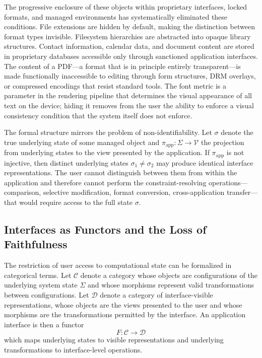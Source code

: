 \documentclass[12pt, oneside]{article}
\begin{document}
The progressive enclosure of these objects within proprietary interfaces, locked formats, and managed environments has systematically eliminated these conditions. File extensions are hidden by default, making the distinction between format types invisible. Filesystem hierarchies are abstracted into opaque library structures. Contact information, calendar data, and document content are stored in proprietary databases accessible only through sanctioned application interfaces. The content of a PDF---a format that is in principle entirely transparent---is made functionally inaccessible to editing through form structures, DRM overlays, or compressed encodings that resist standard tools. The font metric is a parameter in the rendering pipeline that determines the visual appearance of all text on the device; hiding it removes from the user the ability to enforce a visual consistency condition that the system itself does not enforce.

The formal structure mirrors the problem of non-identifiability. Let $\sigma$ denote the true underlying state of some managed object and $\pi_{\text{app}} : \Sigma \to \mathcal{V}$ the projection from underlying states to the view presented by the application. If $\pi_{\text{app}}$ is not injective, then distinct underlying states $\sigma_1 \neq \sigma_2$ may produce identical interface representations. The user cannot distinguish between them from within the application and therefore cannot perform the constraint-resolving operations---comparison, selective modification, format conversion, cross-application transfer---that would require access to the full state $\sigma$.

\subsection{Interfaces as Functors and the Loss of Faithfulness}

The restriction of user access to computational state can be formalized in categorical terms. Let $\mathcal{C}$ denote a category whose objects are configurations of the underlying system state $\Sigma$ and whose morphisms represent valid transformations between configurations. Let $\mathcal{D}$ denote a category of interface-visible representations, whose objects are the views presented to the user and whose morphisms are the transformations permitted by the interface. An application interface is then a functor
\begin{equation}
  F : \mathcal{C} \to \mathcal{D}
\end{equation}
which maps underlying states to visible representations and underlying transformations to interface-level operations.
\end{document}
